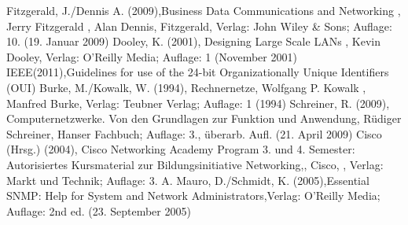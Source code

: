 Fitzgerald, J./Dennis A. (2009),Business Data Communications and Networking , Jerry Fitzgerald , Alan Dennis, Fitzgerald, Verlag: John Wiley \& Sons; Auflage: 10. (19. Januar 2009)
Dooley, K. (2001), Designing Large Scale LANs , Kevin Dooley, Verlag: O'Reilly Media; Auflage: 1 (November 2001)
IEEE(2011),Guidelines for use of the 24-bit Organizationally Unique Identifiers (OUI)
Burke, M./Kowalk, W. (1994), Rechnernetze, Wolfgang P. Kowalk , Manfred Burke, Verlag: Teubner Verlag; Auflage: 1 (1994)
Schreiner, R. (2009), Computernetzwerke. Von den Grundlagen zur Funktion und Anwendung, Rüdiger Schreiner, Hanser Fachbuch; Auflage: 3., überarb. Aufl. (21. April 2009)
Cisco (Hrsg.) (2004), Cisco Networking Academy Program 3. und 4. Semester: Autorisiertes Kursmaterial zur Bildungsinitiative Networking,, Cisco, , Verlag: Markt und Technik; Auflage: 3. A. 
Mauro, D./Schmidt, K. (2005),Essential SNMP: Help for System and Network Administrators,Verlag: O'Reilly Media; Auflage: 2nd ed. (23. September 2005)



